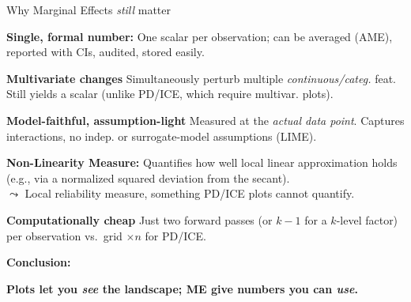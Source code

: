 \documentclass[10pt,compress,t,notes=noshow, xcolor=table]{beamer}
\begin{document}
\begin{framev}[align=top]{Why Marginal Effects \emph{still} matter}
\begin{itemizeM}
\item \textbf{Single, formal number:} One \alert{scalar} per observation; can be averaged (AME), reported with CIs, audited, stored easily.
\item \textbf{Multivariate changes}
Simultaneously perturb multiple \emph{continuous/categ.} feat.
Still yields a scalar (unlike PD/ICE, which require multivar. plots).
\item \textbf{Model-faithful, assumption-light}
Measured at the \emph{actual data point}.
Captures interactions, no indep. or surrogate-model assumptions (LIME).
\item \textbf{Non-Linearity Measure:}
Quantifies how well local linear approximation holds (e.g., via a normalized squared deviation from the secant). \\
$\leadsto$ Local reliability measure, something PD/ICE plots cannot quantify.
\item \textbf{Computationally cheap}
Just two forward passes (or $k\!-\!1$ for a $k$-level factor) per observation vs.\ grid $\times n$ for PD/ICE.
\end{itemizeM}
\spacer[0.25]
\textbf{Conclusion:}
\begin{center}
\textbf{Plots let you \emph{see} the landscape;\quad
ME give numbers you can \emph{use}.}
\end{center}
\end{framev}
\end{document}
